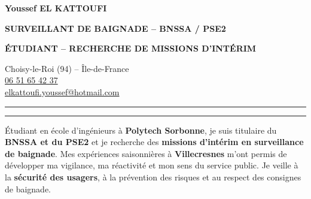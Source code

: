 \documentclass[10pt,a4paper]{extarticle}
\begin{document}
\begin{minipage}[t]{.625\linewidth}
  {\fontsize{21.2}{22.3}\selectfont\bfseries\color{bleu}Youssef EL KATTOUFI}\par\vspace{2pt}
  {\fontsize{11}{12.8}\selectfont\bfseries\color{rouge}SURVEILLANT DE BAIGNADE -- BNSSA / PSE2}\par\vspace{2pt}
  {\fontsize{9.8}{11.5}\selectfont\bfseries\color{bleu}ÉTUDIANT -- RECHERCHE DE MISSIONS D'INTÉRIM}\par
\end{minipage}\hfill
\begin{minipage}[t]{.365\linewidth}\raggedleft
  {\fontsize{9.4}{11.2}\selectfont
  Choisy-le-Roi (94) -- Île-de-France\\
  \href{tel:+33651654237}{06 51 65 42 37}\\
  \href{mailto:elkattoufi.youssef@hotmail.com}{elkattoufi.youssef@hotmail.com}}
\end{minipage}
\vspace{5.5pt}
\textcolor{rouge}{\rule{1.35cm}{1.75pt}}\hspace{1pt}\textcolor{gris!65}{\rule{\dimexpr\linewidth-1.45cm\relax}{.6pt}}\par\vspace{4pt}
{\fontsize{10.2}{12.5}\selectfont
Étudiant en école d'ingénieurs à \textbf{Polytech Sorbonne}, je suis titulaire du \textbf{BNSSA et du PSE2} et je recherche des \textbf{missions d'intérim en surveillance de baignade}. Mes expériences saisonnières à \textbf{Villecresnes} m'ont permis de développer ma vigilance, ma réactivité et mon sens du service public. Je veille à la \textbf{sécurité des usagers}, à la prévention des risques et au respect des consignes de baignade.\par}
\end{document}
